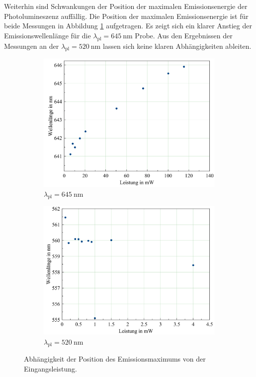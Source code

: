 Weiterhin sind Schwankungen der Position der maximalen Emissionsenergie der Photolumineszenz auffällig. Die Position der maximalen Emissionsenergie ist für beide Messungen in Abbildung \ref{fig:posem} aufgetragen. Es zeigt sich ein klarer Anstieg der Emissionswellenlänge für die $\lambda_{\text{pl}}=\SI{645}{\nano\meter}$ Probe. Aus den Ergebnissen der Messungen an der $\lambda_{\text{pl}}=\SI{520}{\nano\meter}$ lassen sich keine klaren Abhängigkeiten ableiten.
\begin{figure}[H]
  \centering
  \begin{subfigure}{0.49\textwidth}
    \includegraphics[width=\textwidth]{plots/posemplot_645nm.png}
    \caption{$\lambda_{\text{pl}} = \SI{645}{\nano\meter}$}
  \end{subfigure}
  \begin{subfigure}{0.49\textwidth}
    \includegraphics[width=\textwidth]{plots/posemplot_520.png}
    \caption{$\lambda_{\text{pl}} = \SI{520}{\nano\meter}$}
  \end{subfigure}
  \caption{Abhängigkeit der Position des Emissionsmaximums von der Eingangsleistung.}
  \label{fig:posem}
\end{figure}

